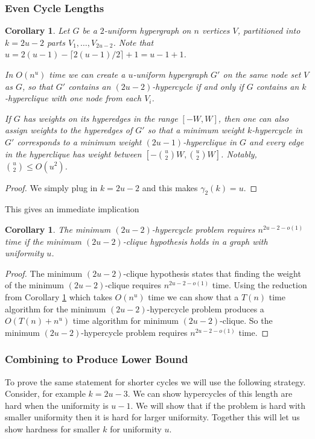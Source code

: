 \documentclass[11pt,letterpaper,pdftex]{article}
\newtheorem{corollary}[theorem]{Corollary}
\begin{document}
\subsubsection{Even Cycle Lengths}

\begin{corollary}
    \label{cor: reverseUandKMineven}
    Let $G$ be a $2$-uniform hypergraph on $n$ vertices $V$, partitioned into $k = 2u-2$ parts $V_1,\ldots,V_{2u-2}$. Note that $u=2(u-1)-\lceil 2(u-1)/2\rceil +1 = u-1+1$.
    
    In $O(n^{u})$ time we can create a $u$-uniform hypergraph $G'$ on the same node set $V$ as $G$, so that $G'$ contains an $(2u-2)$-hypercycle if and only if $G$ contains an $k$-hyperclique with one node from each $V_i$.
    
    If $G$ has weights on its hyperedges in the range $[-W,W]$, then one can also assign weights to the hyperedges of $G'$ so that a minimum weight $k$-hypercycle in $G'$ corresponds to a minimum weight $(2u-1)$-hyperclique in $G$ and every edge in the hyperclique has weight between $[-\binom{u}{2}W,\binom{u}{2}W]$. Notably, $\binom{u}{2}\leq O(u^2)$.
\end{corollary}
\begin{proof}
We simply plug in $k = 2u-2$ and this makes $\gamma_2(k)=u$.
\end{proof}

This gives an immediate implication 

\begin{corollary}
The minimum $(2u-2)$-hypercycle problem requires $n^{2u-2-o(1)}$ time if the minimum $(2u-2)$-clique hypothesis holds in a graph with uniformity $u$. 
\label{cor:min2u-1ishardEven}
\end{corollary}
\begin{proof}
    The minimum $(2u-2)$-clique hypothesis states that finding the weight of the minimum $(2u-2)$-clique requires $n^{2u-2-o(1)}$ time. Using the reduction from Corollary \ref{cor: reverseUandKMineven} which takes $O(n^{u})$ time we can show that a $T(n)$ time algorithm for the minimum $(2u-2)$-hypercycle problem produces a $O(T(n) + n^u)$ time algorithm for minimum $(2u-2)$-clique. So the minimum $(2u-2)$-hypercycle problem requires $n^{2u-2-o(1)}$ time.
\end{proof}


\subsubsection{Combining to Produce Lower Bound}
To prove the same statement for shorter cycles we will use the following strategy. Consider, for example $k = 2u-3$. We can show hypercycles of this length are hard when the uniformity is $u-1$. We will show that if the problem is hard with smaller uniformity then it is hard for larger uniformity. Together this will let us show hardness for smaller $k$ for uniformity $u$.
\end{document}
